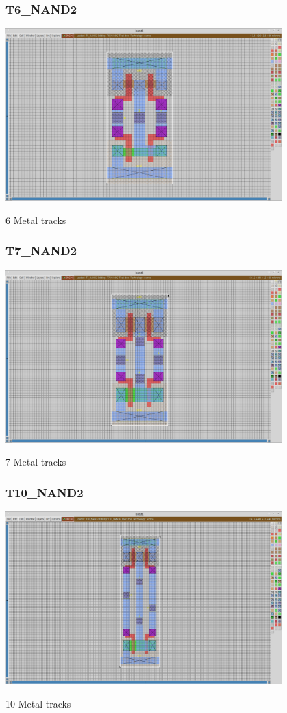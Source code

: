 \documentclass[aspectratio=169]{beamer}
\begin{document}
\begin{frame}
\frametitle{T6\_NAND2}
    \begin{center}
        \includegraphics[width=0.8\textwidth]{T6_NAND2.png}
    \end{center}
6 Metal tracks
\end{frame}


\begin{frame}
\frametitle{T7\_NAND2}
    \begin{center}
        \includegraphics[width=0.8\textwidth]{T7_NAND2.png}
    \end{center}
7 Metal tracks
\end{frame}


\begin{frame}
\frametitle{T10\_NAND2}
    \begin{center}
        \includegraphics[width=0.8\textwidth]{T10_NAND2.png}
    \end{center}
10 Metal tracks
\end{frame}
\end{document}
